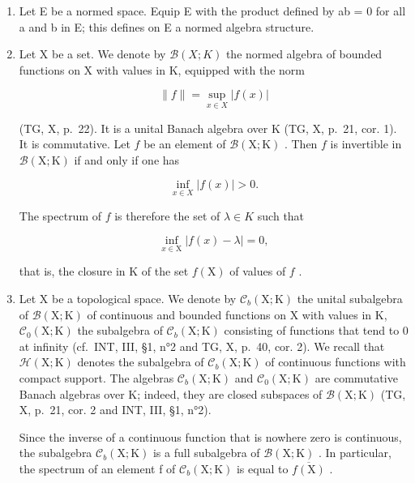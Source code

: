 \begin{enumerate}
\def\labelenumi{\arabic{enumi})}
\item
  Let E be a normed space. Equip E with the product defined by ab = 0 for all a and b in E; this defines on E a normed algebra structure.
\item
  Let X be a set. We denote by \(\mathcal{B}(X;K)\) the normed algebra of bounded functions on X with values in K, equipped with the norm

\[
\| f \| = \sup _ {x \in X} | f (x) |
\]

(TG, X, p.~22). It is a unital Banach algebra over K (TG, X, p.~21, cor. 1). It is commutative. Let \(f\) be an element of \(\mathcal{B}(\mathrm{X};\mathrm{K})\) . Then \(f\) is invertible in \(\mathcal{B}(\mathrm{X};\mathrm{K})\) if and only if one has

\[
\inf _ {x \in X} | f (x) | > 0.
\]

The spectrum of \(f\) is therefore the set of \(\lambda\in K\) such that

\[
\inf _ {x \in \mathrm{X}} | f (x) - \lambda | = 0,
\]

that is, the closure in K of the set \(f(\mathrm{X})\) of values of \(f\) .

\item
  Let X be a topological space. We denote by \(\mathcal{C}_{b}(\mathrm{X};\mathrm{K})\) the unital subalgebra of \(\mathcal{B}(\mathrm{X};\mathrm{K})\) of continuous and bounded functions on X with values in K, \(\mathcal{C}_{0}(\mathrm{X};\mathrm{K})\) the subalgebra of \(\mathcal{C}_{b}(\mathrm{X};\mathrm{K})\) consisting of functions that tend to 0 at infinity (cf.~INT, III, §1, n°2 and TG, X, p.~40, cor. 2). We recall that \(\mathcal{H}(\mathrm{X};\mathrm{K})\) denotes the subalgebra of \(\mathcal{C}_{b}(\mathrm{X};\mathrm{K})\) of continuous functions with compact support.
The algebras \(\mathcal{C}_{b}(\mathrm{X};\mathrm{K})\) and \(\mathcal{C}_{0}(\mathrm{X};\mathrm{K})\) are commutative Banach algebras over K; indeed, they are closed subspaces of \(\mathcal{B}(\mathrm{X};\mathrm{K})\) (TG, X, p.~21, cor. 2 and INT, III, §1, n°2).

Since the inverse of a continuous function that is nowhere zero is continuous, the subalgebra \(\mathcal{C}_{b}(\mathrm{X};\mathrm{K})\) is a full subalgebra of \(\mathcal{B}(\mathrm{X};\mathrm{K})\) . In particular, the spectrum of an element f of \(\mathcal{C}_{b}(\mathrm{X};\mathrm{K})\) is equal to \(\overline{f(\mathrm{X})}\) .


\end{enumerate}

